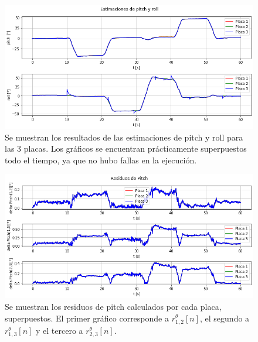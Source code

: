 \begin{figure}[htb]
    \centering
    \includegraphics[width=\textwidth]{img/resultados_pitch_roll_saltos_aleatorios.png}
    \caption{Se muestran los resultados de las estimaciones de pitch y roll para las 3 placas. Los gráficos se encuentran prácticamente superpuestos todo el tiempo, ya que no hubo fallas en la ejecución.}
    \label{fig:resultados_pitch_roll_saltos_aleatorios}
\end{figure}

\begin{figure}[htb]
    \centering
    \includegraphics[width=\textwidth]{img/resultados_residuos_pitch_saltos_aleatorios.png}
    \caption{Se muestran los residuos de pitch calculados por cada placa, superpuestos. El primer gráfico corresponde a $r_{1,2}^{\theta}[n]$, el segundo a $r_{1,3}^{\theta}[n]$ y el tercero a $r_{2,3}^{\theta}[n]$.}
    \label{fig:resultados_residuos_pitch_saltos_aleatorios}
\end{figure}

